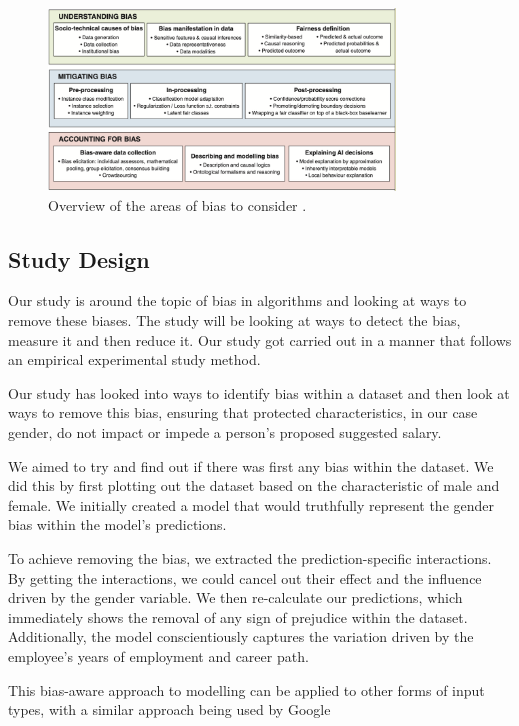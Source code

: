 \documentclass{sigchi}
\begin{document}
	\begin{figure}[h]
		\includegraphics[width=9.2cm]{bias_advice.png}
		\caption{Overview of the areas of bias to consider \cite{three}.} %
		\label{fig:bias_advice}
		\centering
	\end{figure}
	
	

\subsection{Study Design}
	Our study is around the topic of bias in algorithms and looking at ways to remove these biases. The study will be looking at ways to detect the bias, measure it and then reduce it. Our study got carried out in a manner that follows an empirical experimental study method. 

	Our study has looked into ways to identify bias within a dataset and then look at ways to remove this bias, ensuring that protected characteristics, in our case gender, do not impact or impede a person's proposed suggested salary.  

	We aimed to try and find out if there was first any bias within the dataset. We did this by first plotting out the dataset based on the characteristic of male and female. We initially created a model that would truthfully represent the gender bias within the model's predictions.

	To achieve removing the bias, we extracted the prediction-specific interactions. By getting the interactions, we could cancel out their effect and the influence driven by the gender variable. We then re-calculate our predictions, which immediately shows the removal of any sign of prejudice within the dataset. Additionally, the model conscientiously captures the variation driven by the employee's years of employment and career path. 

	This bias-aware approach to modelling can be applied to other forms of input types, with a similar approach being used by Google \cite{google_ref}
\end{document}
